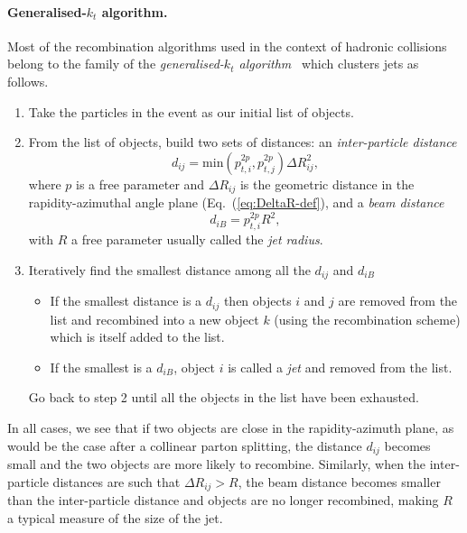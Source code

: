 \paragraph{Generalised-$k_t$ algorithm.}
%
Most of the recombination algorithms used in the context of hadronic
collisions belong to the family of the {\em generalised-$k_t$
  algorithm}~\cite{Cacciari:2011ma} which clusters jets as follows.
\begin{enumerate}
\item Take the particles in the event as our initial list of objects.
\item From the list of objects, build two sets of distances: an
  {\em inter-particle distance}
  \begin{equation}
    d_{ij} = \text{min}(p_{t,i}^{2p},p_{t,j}^{2p})\Delta R_{ij}^2,
  \end{equation}
  where $p$ is a free parameter and $\Delta R_{ij}$ is the geometric
  distance in the rapidity-azimuthal angle plane
  (Eq.~(\ref{eq:DeltaR-def}), and a {\em beam distance}
  \begin{equation}
    d_{iB} = p_{t,i}^{2p}R^2,
  \end{equation}
  with $R$ a free parameter usually called the {\em jet radius}.
\item Iteratively find the smallest distance among all the
  $d_{ij}$ and $d_{iB}$
  \begin{itemize}
  \item If the smallest distance is a $d_{ij}$ then objects $i$ and
    $j$ are removed from the list and recombined into a new object $k$
    (using the recombination scheme) which is itself added to the
    list.
  \item If the smallest is a $d_{iB}$, object $i$ is called a {\em
      jet} and removed from the list.
  \end{itemize}
  Go back to step 2 until all the objects in the list have
  been exhausted.
\end{enumerate}

In all cases, we see that if two objects are close in the
rapidity-azimuth plane, as would be the case after a collinear parton
splitting, the distance $d_{ij}$ becomes small and the two objects are
more likely to recombine. Similarly, when the inter-particle distances
are such that $\Delta R_{ij}>R$, the beam distance becomes smaller
than the inter-particle distance and objects are no longer recombined,
making $R$ a typical measure of the size of the jet.

